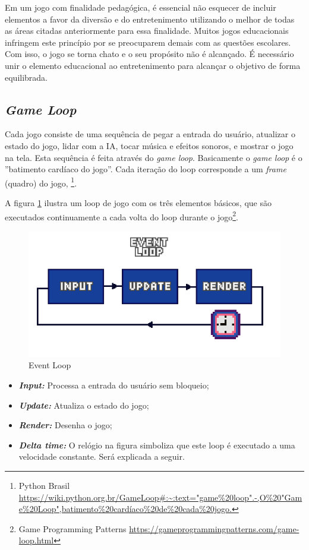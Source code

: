 Em um jogo com finalidade pedagógica, é essencial não esquecer de incluir elementos a favor da diversão e do entretenimento utilizando o melhor de todas as áreas citadas anteriormente para essa finalidade. Muitos jogos educacionais infringem este princípio por se preocuparem demais com as questões escolares. Com isso, o jogo se torna chato e o seu propósito não é alcançado. É necessário unir o elemento educacional ao entretenimento para alcançar o objetivo de forma equilibrada.

\subsection{\textit{Game Loop}}
\label{sec:game-loop}
Cada jogo consiste de uma sequência de pegar a entrada do usuário, atualizar o estado do jogo, lidar com a IA, tocar música e efeitos sonoros, e mostrar o jogo na tela. Esta sequência é feita através do \textit{game loop}. Basicamente o \textit{game loop} é o ''batimento cardíaco do jogo''. Cada iteração do loop corresponde a um \textit{frame} (quadro) do jogo, \footnote{Python Brasil \url{https://wiki.python.org.br/GameLoop#:~:text="game%20loop".-,O%20"Game%20Loop",batimento%20cardíaco%20de%20cada%20jogo.}}.

A figura \ref{fig:event-loop} ilustra um loop de jogo com os três elementos básicos, que são executados continuamente a cada volta do loop durante o jogo\footnote{Game Programming Patterns \url{https://gameprogrammingpatterns.com/game-loop.html}}.


\begin{figure}[h!]
    \centering
    \includegraphics[width=1\linewidth]{figuras/event-loop.png}
    \caption{Event Loop}
    \label{fig:event-loop}
\end{figure}

\begin{itemize}
    \item \textit{\textbf{Input:}} Processa a entrada do usuário sem bloqueio;
    \item \textit{\textbf{Update:}} Atualiza o estado do jogo;
    \item \textit{\textbf{Render:}}  Desenha o jogo;
    \item \textit{\textbf{Delta time:}} O relógio na figura simboliza que este loop é executado a uma velocidade constante. Será explicada a seguir. 
\end{itemize}

